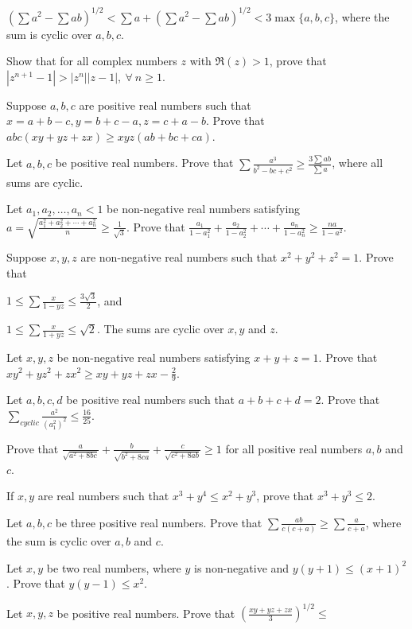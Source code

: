   $\left(\sum a^2 - \sum
  ab\right)^{1/2} < \sum a + \left(\sum a^2 - \sum ab\right)^{1/2} < 3\max\{a, b, c\}$, where the sum is cyclic
  over $a, b, c$.
\item Show that for all complex numbers $z$ with $\Re(z) > 1$, prove that $|z^{n + 1} - 1| > |z^n||z -
  1|,~\forall~n\geq 1$.
\item Suppose $a, b, c$ are positive real numbers such that $x = a + b - c, y = b + c - a, z = c + a - b$. Prove
  that $abc(xy + yz + zx)\geq xyz(ab + bc + ca)$.
\item Let $a, b, c$ be positive real numbers. Prove that $\displaystyle\sum\frac{a^3}{b^2 - bc + c^2}\geq
  \frac{3\sum ab}{\sum a}$, where all sums are cyclic.
\item Let $a_1, a_2, \ldots, a_n < 1$ be non-negative real numbers satisfying $a = \sqrt{\frac{a_1^2 + a_2^2 +
    \cdots + a_n^2}{n}}\geq \frac{1}{\sqrt{3}}$. Prove that $\frac{a_1}{1 - a_1^2} + \frac{a_2}{1 - a_2^2} + \cdots
  + \frac{a_n}{1 - a_n^2}\geq \frac{na}{1 - a^2}$.
\item Suppose $x, y, z$ are non-negative real numbers such that $x^2 + y^2 + z^2 = 1$. Prove that
  \startitemize[n]
  \item $1\leq \sum\frac{x}{1 - yz}\leq\frac{3\sqrt{3}}{2}$, and
  \item $1\leq \sum\frac{x}{1 + yz}\leq \sqrt{2}$.
  \stopitemize
  The sums are cyclic over $x, y$ and $z$.
\item Let $x, y, z$ be non-negative real numbers satisfying $x + y + z = 1$. Prove that $xy^2 + yz^2 + zx^2 \geq xy
  + yz + zx - \frac{2}{9}$.
\item Let $a, b, c, d$ be positive real numbers such that $a + b + c + d = 2$. Prove that
  $\displaystyle\sum_{cyclic}\frac{a^2}{(a^2 _ 1)^2}\leq \frac{16}{25}$.
\item Prove that $\frac{a}{\sqrt{a^2 + 8bc}} + \frac{b}{\sqrt{b^2 + 8ca}} + \frac{c}{\sqrt{c^2 + 8ab}}\geq 1$ for
  all positive real numbers $a, b$ and $c$.
\item If $x, y$ are real numbers such that $x^3 + y^4 \leq x^2 + y^3$, prove that $x^3 + y^3\leq 2$.
\item Let $a, b, c$ be three positive real numbers. Prove that $\sum \frac{ab}{c(c + a)}\geq\sum\frac{a}{c + a}$,
  where the sum is cyclic over $a, b$ and $c$.
\item Let $x, y$ be two real numbers, where $y$ is non-negative and $y(y + 1)\leq (x + 1)^2$. Prove that $y(y -
  1)\leq x^2$.
\item Let $x, y, z$ be positive real numbers. Prove that $\left(\frac{xy + yz + zx}{3}\right)^{1/2}\leq$

